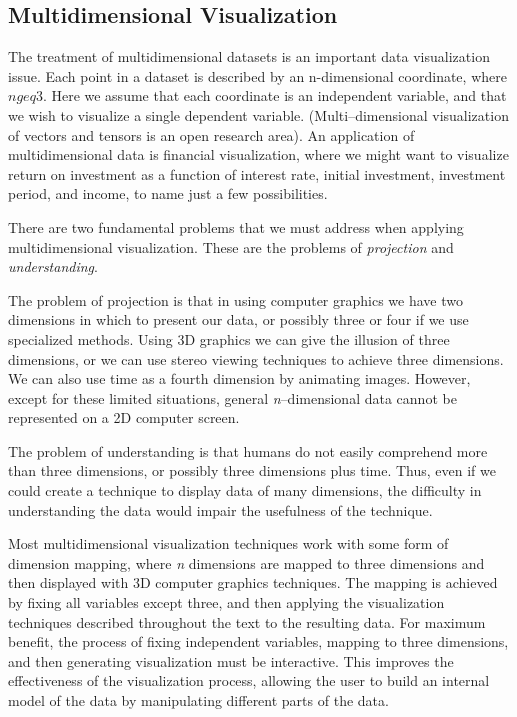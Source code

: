 \subsection{Multidimensional Visualization}

The treatment of multidimensional datasets is an important data visualization issue. Each point in a dataset is described by an n-dimensional coordinate, where $n geq 3$. Here we assume that each coordinate is an independent variable, and that we wish to visualize a single dependent variable. (Multi--dimensional visualization of vectors and tensors is an open research area). An application of multidimensional data is financial visualization, where we might want to visualize return on investment as a function of interest rate, initial investment, investment period, and income, to name just a few possibilities.

There are two fundamental problems that we must address when applying multidimensional visualization. These are the problems of \emph{projection} and \emph{understanding}.

The problem of projection is that in using computer graphics we have two dimensions in which to present our data, or possibly three or four if we use specialized methods. Using 3D graphics we can give the illusion of three dimensions, or we can use stereo viewing techniques to achieve three dimensions. We can also use time as a fourth dimension by animating images. However, except for these limited situations, general \emph{n}--dimensional data cannot be represented on a 2D computer screen.

The problem of understanding is that humans do not easily comprehend more than three dimensions, or possibly three dimensions plus time. Thus, even if we could create a technique to display data of many dimensions, the difficulty in understanding the data would impair the usefulness of the technique.

Most multidimensional visualization techniques work with some form of dimension mapping, where \emph{n} dimensions are mapped to three dimensions and then displayed with 3D computer graphics techniques. The mapping is achieved by fixing all variables except three, and then applying the visualization techniques described throughout the text to the resulting data. For maximum benefit, the process of fixing independent variables, mapping to three dimensions, and then generating visualization must be interactive. This improves the effectiveness of the visualization process, allowing the user to build an internal model of the data by manipulating different parts of the data.

